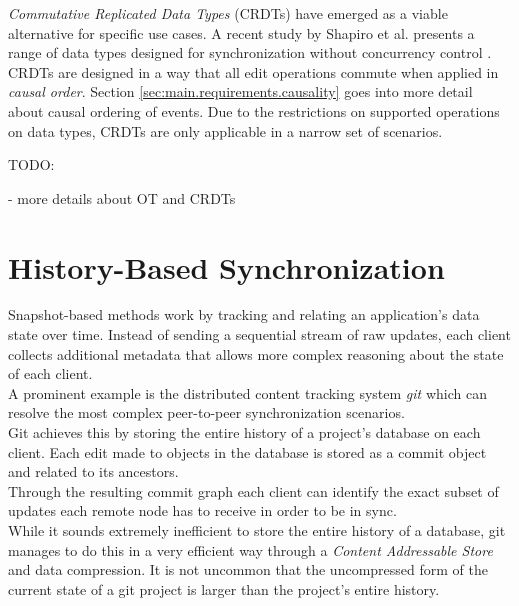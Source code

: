 \emph{Commutative Replicated Data Types} (CRDTs) have emerged as a viable alternative for specific use cases.
A recent study by Shapiro et al. presents a range of data types designed for synchronization without concurrency control \cite{Shapiro:2011wy}.\\
CRDTs are designed in a way that all edit operations commute when applied in \emph{causal order}.
Section \ref{sec:main.requirements.causality} goes into more detail about causal ordering of events.
Due to the restrictions on supported operations on data types, CRDTs are only applicable in a narrow set of scenarios.

TODO:

- more details about OT and CRDTs

\section{History-Based Synchronization}
\label{sec:background.history-based}
Snapshot-based methods work by tracking and relating an application's data state over time.
Instead of sending a sequential stream of raw updates, each client collects additional metadata that allows more complex reasoning about the state of each client.\\
A prominent example is the distributed content tracking system \emph{git} \cite{git} which can resolve the most complex peer-to-peer synchronization scenarios.\\
Git achieves this by storing the entire history of a project's database on each client.
Each edit made to objects in the database is stored as a commit object and related to its ancestors.\\
Through the resulting commit graph each client can identify the exact subset of updates each remote node has to receive in order to be in sync.\\
While it sounds extremely inefficient to store the entire history of a database, git manages to do this in a very efficient way through a \emph{Content Addressable Store} and data compression.
It is not uncommon that the uncompressed form of the current state of a git project is larger than the project's entire history.

